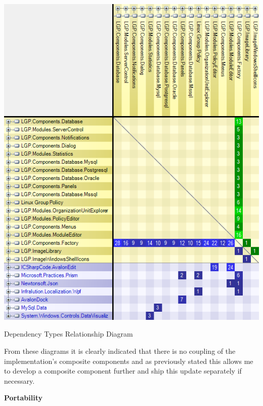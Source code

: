 {		\begin{figurehere}
			\centering
			\includegraphics[scale=0.85]{pages/chapter4/figures/dependancyMatrixTypes.png}
			\caption{Dependency Types Relationship Diagram}
			\label{fig:DependancyTypesRelationshipDiagram}
		\end{figurehere}
		
		\vspace{5mm}
		From these diagrams it is clearly indicated that there is no coupling of the implementation's 
		composite components and as previously stated this allows me to develop a composite component further and 
		ship this update separately if necessary.
		\newline
	}			

	\large{\bfseries{Portability}}
	\vspace{2mm}
	
